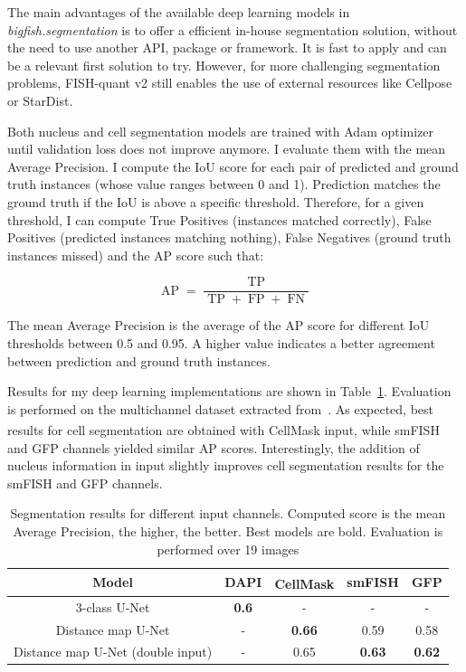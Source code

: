 The main advantages of the available deep learning models in \emph{bigfish.segmentation} is to offer a efficient in-house segmentation solution, without the need to use another API, package or framework.
It is fast to apply and can be a relevant first solution to try.
However, for more challenging segmentation problems, FISH-quant v2 still enables the use of external resources like Cellpose or StarDist.

Both nucleus and cell segmentation models are trained with Adam optimizer~\cite{Diederik_2015} until validation loss does not improve anymore.
I evaluate them with the mean Average Precision.
I compute the \ac{IoU} score for each pair of predicted and ground truth instances (whose value ranges between 0 and 1).
Prediction matches the ground truth if the \ac{IoU} is above a specific threshold.
Therefore, for a given threshold, I can compute True Positives (instances matched correctly), False Positives (predicted instances matching nothing), False Negatives (ground truth instances missed) and the \ac{AP} score such that:

\begin{equation}
	{\displaystyle \operatorname{AP} = \frac{\operatorname{TP}}{\operatorname{TP} + \operatorname{FP} + \operatorname{FN}}}
\end{equation}

\noindent
The mean Average Precision is the average of the \ac{AP} score for different \ac{IoU} thresholds between 0.5 and 0.95.
A higher value indicates a better agreement between prediction and ground truth instances.

Results for my deep learning implementations are shown in Table~\ref{table:segmentation_results}.
Evaluation is performed on the multichannel dataset extracted from~\cite{safieddine_choreography_2021}.
As expected, best results for cell segmentation are obtained with CellMask\textsuperscript{\texttrademark} input, while \ac{smFISH} and \ac{GFP} channels yielded similar \ac{AP} scores.
Interestingly, the addition of nucleus information in input slightly improves cell segmentation results for the \ac{smFISH} and \ac{GFP} channels.

\begin{table}[]
	\centering
	\begin{tabular}{| c | c | c | c | c |}
		\hline
		Model & DAPI & CellMask\textsuperscript{\texttrademark} & smFISH & GFP\\
		\hline
		3-class U-Net & \textbf{0.6} & - & - & -\\
		Distance map U-Net & - & \textbf{0.66} & 0.59 & 0.58\\
		Distance map U-Net (double input) & - & 0.65 & \textbf{0.63} & \textbf{0.62}\\
		\hline
	\end{tabular}
	\caption[Segmentation results]{Segmentation results for different input channels.
	Computed score is the mean Average Precision, the higher, the better.
	Best models are bold.
	Evaluation is performed over 19 images}
	\label{table:segmentation_results}
\end{table}

